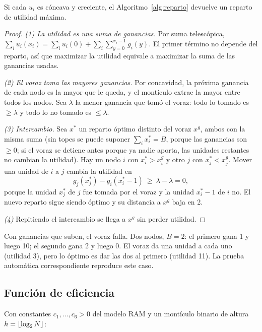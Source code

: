 \begin{teorema}
Si cada $u_i$ es cóncava y creciente, el Algoritmo~\ref{alg:reparto} devuelve un reparto de
utilidad máxima.
\end{teorema}
\begin{proof}
\emph{(1) La utilidad es una suma de ganancias.} Por suma telescópica,
$\sum_i u_i(x_i)=\sum_i u_i(0)+\sum_i\sum_{y=0}^{x_i-1} g_i(y)$. El primer término no depende del
reparto, así que maximizar la utilidad equivale a maximizar la suma de las ganancias usadas.

\emph{(2) El voraz toma las mayores ganancias.} Por concavidad, la próxima ganancia de cada nodo es
la mayor que le queda, y el montículo extrae la mayor entre todos los nodos. Sea $\lambda$ la menor
ganancia que tomó el voraz: todo lo tomado es $\ge\lambda$ y todo lo no tomado es $\le\lambda$.

\emph{(3) Intercambio.} Sea $x^*$ un reparto óptimo distinto del voraz $x^g$, ambos con la misma
suma (sin topes se puede suponer $\sum_i x^*_i=B$, porque las ganancias son $\ge0$; si el voraz se
detiene antes porque ya nadie aporta, las unidades restantes no cambian la utilidad). Hay un nodo
$i$ con $x^*_i>x^g_i$ y otro $j$ con $x^*_j<x^g_j$. Mover una unidad de $i$ a $j$ cambia la
utilidad en
\[
  g_j(x^*_j)-g_i(x^*_i-1)\ \ge\ \lambda-\lambda=0,
\]
porque la unidad $x^*_j$ de $j$ fue tomada por el voraz y la unidad $x^*_i-1$ de $i$ no. El nuevo
reparto sigue siendo óptimo y su distancia a $x^g$ baja en 2.

\emph{(4)} Repitiendo el intercambio se llega a $x^g$ sin perder utilidad.
\end{proof}

\begin{observacion}
Con ganancias que suben, el voraz falla. Dos nodos, $B=2$: el primero gana 1 y luego 10; el
segundo gana 2 y luego 0. El voraz da una unidad a cada uno (utilidad 3), pero lo óptimo es dar
las dos al primero (utilidad 11). La prueba automática correspondiente
reproduce este caso.
\end{observacion}

\subsection{Función de eficiencia}

Con constantes $c_1,\dots,c_6>0$ del modelo RAM y un montículo binario de altura
$h=\lfloor\log_2 N\rfloor$:

